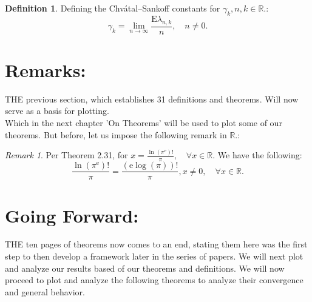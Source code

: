 \documentclass[10pt]{article}
\theoremstyle{plain}
\theoremstyle{definition}
\newtheorem{definition}[theorem]{Definition}
\theoremstyle{remark}
\newtheorem{remark}[theorem]{Remark}
\begin{document}
\begin{definition}
	Defining the Chvátal–Sankoff constants for $\gamma_k, n, k \in \mathbb{R}.$:
	\begin{equation}
		\gamma_k = \lim_{n \to \infty} \frac{\mathrm{E}{\lambda_{n, k}}}{n}, \quad n \neq 0.
	\end{equation}
\end{definition}

\section{Remarks:}
\lettrine[lines=2, lhang=0.1, loversize=0.2]{T}HE previous section, which establishes 31 definitions and theorems. Will now serve as a basis for plotting.\\
Which in the next chapter 'On Theorems' will be used to plot some of our theorems. But before, let us impose the following remark in $\mathbb{R}.$:

\begin{remark}
	Per Theorem 2.31, for $x = \frac{\ln(\pi^\mathrm{e})!}{\pi}, \quad \forall x \in \mathbb{R}.$ We have the following:
	\begin{equation}
		\frac{\ln(\pi^\mathrm{e})!}{\pi} = \frac{(\mathrm{e} \log(\pi))!}{\pi}, x \neq 0, \quad \forall x \in \mathbb{R}.
	\end{equation}
\end{remark}

\section{Going Forward:}

\lettrine[lines=2, lhang=0.1, loversize=0.2]{T}HE ten pages of theorems now comes to an end, stating them here was the first step to then develop a framework later in the series of papers. We will next plot and analyze our results based of our theorems and definitions. We will now proceed to plot and analyze the following theorems to analyze their convergence and general behavior.

\nocite{*}




\end{document}
